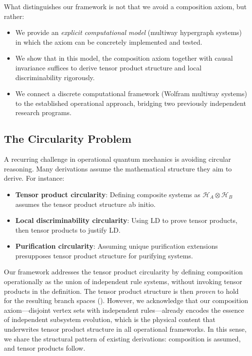 \documentclass[11pt,a4paper]{article}
\theoremstyle{definition}
\theoremstyle{remark}
\newcommand{\Hilb}{\mathcal{H}}
\begin{document}
What distinguishes our framework is not that we avoid a composition
axiom, but rather:
\begin{itemize}
\item We provide an \textit{explicit computational model} (multiway
  hypergraph systems) in which the axiom can be concretely implemented
  and tested.
\item We show that in this model, the composition axiom together with
  causal invariance suffices to derive tensor product structure and local
  discriminability rigorously.
\item We connect a discrete computational framework (Wolfram multiway
  systems) to the established operational approach, bridging two
  previously independent research programs.
\end{itemize}

\subsection{The Circularity Problem}

A recurring challenge in operational quantum mechanics is avoiding
circular reasoning. Many derivations assume the mathematical structure
they aim to derive. For instance:

\begin{itemize}
\item \textbf{Tensor product circularity}: Defining composite systems as
  $\Hilb_A \otimes \Hilb_B$ assumes the tensor product structure ab
  initio.
\item \textbf{Local discriminability circularity}: Using LD to prove
  tensor products, then tensor products to justify LD.
\item \textbf{Purification circularity}: Assuming unique purification
  extensions presupposes tensor product structure for purifying systems.
\end{itemize}

Our framework addresses the tensor product circularity by defining
composition operationally as the union of independent rule systems,
without invoking tensor products in the definition. The tensor product
structure is then \textit{proven} to hold for the resulting branch spaces
(). However, we acknowledge that our
composition axiom---disjoint vertex sets with independent rules---already
encodes the essence of independent subsystem evolution, which is the
physical content that underwrites tensor product structure in all
operational frameworks. In this sense, we share the structural pattern of
existing derivations: composition is assumed, and tensor products follow.
\end{document}
